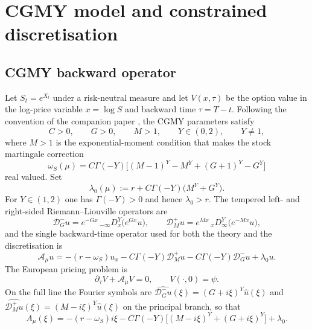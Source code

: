 \documentclass[hidelinks]{siamart251216}
\newcommand{\rf}{r}
\newcommand{\Dm}{\mathcal D_G^-}
\newcommand{\Dp}{\mathcal D_M^+}
\newcommand{\Aop}{\mathcal A_\mu}
\begin{document}
\section{CGMY model and constrained discretisation}
\label{sec:model}\label{sec:galerkin}
\subsection{CGMY backward operator}
\label{ssec:operator}

Let $S_t=e^{X_t}$ under a risk-neutral measure and let $V(x,\tau)$ be the
option value in the log-price variable $x=\log S$ and backward time
$\tau=T-t$.  Following the convention of the companion paper
\cite{DamircheliCGMY2026}, the CGMY parameters satisfy
\begin{equation}
  C>0,\qquad G>0,\qquad M>1,\qquad Y\in(0,2),\qquad Y\ne1,
  \label{eq:cgmy-parameters}
\end{equation}
where $M>1$ is the exponential-moment condition that makes the stock
martingale correction
\begin{equation}
  \omega_S(\mu)
  = C\Gamma(-Y)\bigl[(M-1)^Y-M^Y+(G+1)^Y-G^Y\bigr]
  \label{eq:martingale-correction}
\end{equation}
real valued.  Set
\begin{equation}
  \lambda_0(\mu) := \rf + C\Gamma(-Y)\bigl(M^Y+G^Y\bigr).
  \label{eq:lambda0}
\end{equation}
For $Y\in(1,2)$ one has $\Gamma(-Y)>0$ and hence $\lambda_0>\rf$.  The
tempered left- and right-sided Riemann--Liouville operators are
\begin{equation}
  \Dm u=e^{-Gx}\,{}_{-\infty}D_x^Y\bigl(e^{Gx}u\bigr),
  \qquad
  \Dp u=e^{Mx}\,{}_{x}D_\infty^Y\bigl(e^{-Mx}u\bigr),
  \label{eq:tempered-ops}
\end{equation}
and the single backward-time operator used for both the theory and the
discretisation is
\begin{equation}
  \Aop u
  =-(\rf-\omega_S)u_x
   -C\Gamma(-Y)\Dp u
   -C\Gamma(-Y)\Dm u
   +\lambda_0u.
  \label{eq:cgmy-operator}
\end{equation}
The European pricing problem is
\begin{equation}
  \partial_\tau V+\Aop V=0,
  \qquad
  V(\cdot,0)=\psi.
  \label{eq:pricing-pide}
\end{equation}
On the full line the Fourier symbols are
$\widehat{\Dm u}(\xi)=(G+i\xi)^Y\widehat u(\xi)$ and
$\widehat{\Dp u}(\xi)=(M-i\xi)^Y\widehat u(\xi)$ on the principal branch, so
that
\begin{equation}
  A_\mu(\xi)
  =-(\rf-\omega_S)i\xi
   -C\Gamma(-Y)\bigl[(M-i\xi)^Y+(G+i\xi)^Y\bigr]
   +\lambda_0 .
  \label{eq:symbol}
\end{equation}
\end{document}
